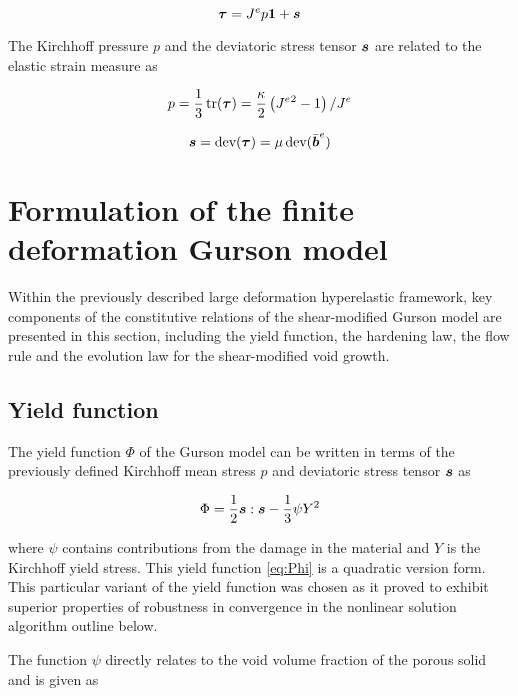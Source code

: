 \begin{equation}\label{eq:Kirchhoff}
{\boldsymbol{\tau}}=J^e p {\boldsymbol{1}} + {\boldsymbol{s}}
\end{equation}

The Kirchhoff pressure $p$ and the deviatoric stress tensor ${\boldsymbol{s}}$ are
related to the elastic strain measure as

\begin{equation}\label{eq:p}
p = \frac{1}{3}\operatorname{\text{tr}}({\boldsymbol{\tau}}) = \frac{\kappa}{2}\left(J^e{^2}-1\right)/J^e
\end{equation}

\begin{equation}\label{eq:s}
{\boldsymbol{s}} = \operatorname{\text{dev}}({\boldsymbol{\tau}}) = \mu\operatorname{\text{dev}}(\bar{{\boldsymbol{b}}}^e)
\end{equation}


\section{Formulation of the finite deformation Gurson model} \label{sec:formulation}

Within the previously described large deformation hyperelastic
framework, key components of the constitutive relations of the
shear-modified Gurson model are presented in this section, including
the yield function, the hardening law, the flow rule and the 
evolution law for the shear-modified void growth.

\subsection{Yield function}
The yield function $\Phi$ of the Gurson model can be written in terms
of the previously defined Kirchhoff mean stress $p$ and deviatoric
stress tensor ${\boldsymbol{s}}$ as

\begin{equation}\label{eq:Phi}
\Phi = \frac{1}{2}{\boldsymbol{s}}:{\boldsymbol{s}} - \frac{1}{3}\psi Y^2
\end{equation}

where $\psi$ contains contributions from the damage in the material
and $Y$ is the Kirchhoff yield stress. This yield function
\eqref{eq:Phi} is a quadratic version form. This particular variant 
of the yield function was chosen as it proved to exhibit superior
properties of robustness in convergence in the nonlinear solution
algorithm outline below.

The function $\psi$ directly relates to the void volume fraction of
the porous solid and is given as

